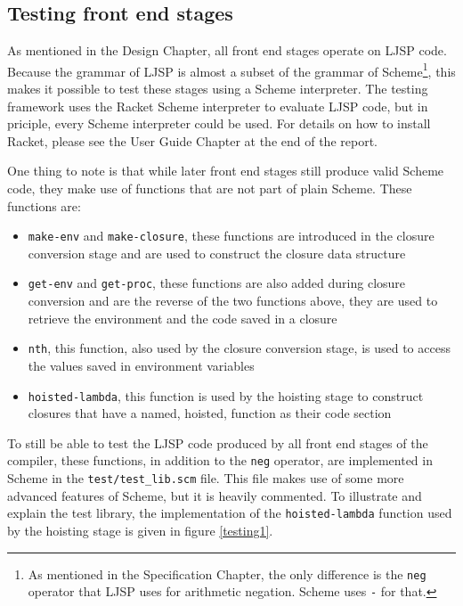 \documentclass[11pt]{report}
\begin{document}

\subsection{Testing front end stages}
As mentioned in the Design Chapter, all front end stages operate on LJSP code. Because the grammar of LJSP is almost a subset of the grammar of Scheme\footnote{As mentioned in the Specification Chapter, the only difference is the \texttt{neg} operator that LJSP uses for arithmetic negation. Scheme uses \texttt{-} for that.}, this makes it possible to test these stages using a Scheme interpreter. The testing framework uses the Racket Scheme interpreter to evaluate LJSP code, but in priciple, every Scheme interpreter could be used. For details on how to install Racket, please see the User Guide Chapter at the end of the report.

One thing to note is that while later front end stages still produce valid Scheme code, they make use of functions that are not part of plain Scheme. These functions are:

\begin{itemize}
\item \texttt{make-env} and \texttt{make-closure}, these functions are introduced in the closure conversion stage and are used to construct the closure data structure
\item \texttt{get-env} and \texttt{get-proc}, these functions are also added during closure conversion and are the reverse of the two functions above, they are used to retrieve the environment and the code saved in a closure
\item \texttt{nth}, this function, also used by the closure conversion stage, is used to access the values saved in environment variables
\item \texttt{hoisted-lambda}, this function is used by the hoisting stage to construct closures that have a named, hoisted, function as their code section
\end{itemize}

To still be able to test the LJSP code produced by all front end stages of the compiler, these functions, in addition to the \texttt{neg} operator, are implemented in Scheme in the \texttt{test/test_lib.scm} file. This file makes use of some more advanced features of Scheme, but it is heavily commented. To illustrate and explain the test library, the implementation of the \texttt{hoisted-lambda} function used by the hoisting stage is given in figure \ref{testing1}.
\end{document}
